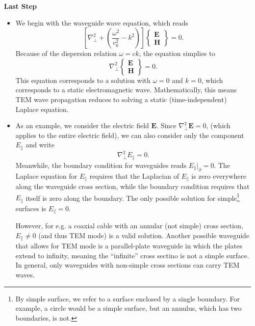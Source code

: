 \documentclass[11pt, a4paper]{article}
\renewcommand{\vec}[1]{\bm{#1}} %
\newcommand{\E}{\vec{E}}  %
\renewcommand{\H}{\vec{H}}  %
\renewcommand{\laplacian}{\nabla^{2}}
\begin{document}
\textbf{Last Step}
\begin{itemize}
	\item We begin with the waveguide wave equation, which reads
	\begin{equation*}
		\left[\laplacian_{\perp} + \left(\frac{\omega^{2}}{c_{0}^{2}} - k^{2}\right)\right]
		\begin{Bmatrix}
			\E\\
			\H
		\end{Bmatrix}
		 = 0.
	\end{equation*}
	Because of the dispersion relation $ \omega = ck $, the equation simplies to
	\begin{equation*}
		\laplacian_{\perp} 
		\begin{Bmatrix}
			\E\\
			\H
		\end{Bmatrix}
		 = 0.
	\end{equation*}
	This equation corresponds to a solution with $ \omega = 0 $ and $ k = 0 $, which corresponds to a static electromagnetic wave. Mathematically, this means TEM wave propagation reduces to solving a static (time-independent) Laplace equation.
	
    \item As an example, we consider the electric field $ \E $. Since $ \laplacian_{\perp}\E = 0 $, (which applies to the entire electric field), we can also consider only the component $ E_{\parallel} $ and write
	\begin{equation*}
		\laplacian_{\perp}E_{\parallel} = 0.
	\end{equation*}
    Meanwhile, the boundary condition for waveguides reads $ E_{\parallel}\big|_{\partial} = 0 $. The Laplace equation for $ E_{\parallel} $ requires that the Laplacian of $ E_{\parallel} $ is zero everywhere along the waveguide cross section, while the boundary condition requires that $ E_{\parallel} $ itself is zero along the boundary. The only possible solution for simple\footnote{By simple surface, we refer to a surface enclosed by a single boundary. For example, a circle would be a simple surface, but an annulus, which has two boundaries, is not.} surfaces is $ E_{\parallel} = 0 $.
	
    However, for e.g. a coaxial cable with an annular (not simple) cross section, $ E_{\parallel} \neq 0 $ (and thus TEM mode) is a valid solution. Another possible waveguide that allows for TEM mode is a parallel-plate waveguide in which the plates extend to infinity, meaning the ``infinite'' cross sectino is not a simple surface. In general, only waveguides with non-simple cross sections can carry TEM waves.
	
\end{itemize}
\end{document}
